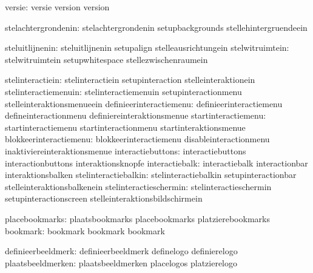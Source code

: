                        versie:  versie                       version
                                version

          stelachtergrondenin:  stelachtergrondenin          setupbackgrounds
                                stellehintergruendeein

              steluitlijnenin:  steluitlijnenin              setupalign
                                stelleausrichtungein
              stelwitruimtein:  stelwitruimtein              setupwhitespace
                                stellezwischenraumein

             stelinteractiein:  stelinteractiein             setupinteraction
                                stelleinteraktionein
         stelinteractiemenuin:  stelinteractiemenuin         setupinteractionmenu
                                stelleinteraktionsmenueein
      definieerinteractiemenu:  definieerinteractiemenu      defineinteractionmenu
                                definiereinteraktionsmenue
          startinteractiemenu:  startinteractiemenu          startinteractionmenu
                                startinteraktionsmenue
       blokkeerinteractiemenu:  blokkeerinteractiemenu       disableinteractionmenu
                                inaktiviereinteraktionsmenue
            interactiebuttons:  interactiebuttons            interactionbuttons
                                interaktionsknopfe
               interactiebalk:  interactiebalk               interactionbar
                                interaktionsbalken
         stelinteractiebalkin:  stelinteractiebalkin         setupinteractionbar
                                stelleinteraktionsbalkenein
       stelinteractieschermin:  stelinteractieschermin       setupinteractionscreen
                                stelleinteraktionsbildschirmein

               placebookmarks:  plaatsbookmarks              placebookmarks
                                platzierebookmarks 
                     bookmark:  bookmark                     bookmark
                                bookmark 

           definieerbeeldmerk:  definieerbeeldmerk           definelogo
                                definierelogo
            plaatsbeeldmerken:  plaatsbeeldmerken            placelogos
                                platzierelogo

